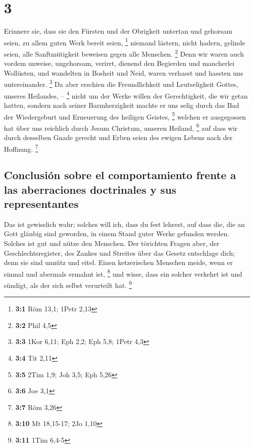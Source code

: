 \hypertarget{section-2}{%
\section{3}\label{section-2}}

 Erinnere sie, dass sie den Fürsten und der Obrigkeit
untertan und gehorsam seien, zu allem guten Werk bereit seien,
\footnote{\textbf{3:1} Röm 13,1; 1Petr 2,13}  niemand
lästern, nicht hadern, gelinde seien, alle Sanftmütigkeit beweisen gegen
alle Menschen. \footnote{\textbf{3:2} Phil 4,5}  Denn wir
waren auch vordem unweise, ungehorsam, verirrt, dienend den Begierden
und mancherlei Wollüsten, und wandelten in Bosheit und Neid, waren
verhasst und hassten uns untereinander. \footnote{\textbf{3:3} 1Kor
  6,11; Eph 2,2; Eph 5,8; 1Petr 4,3}  Da aber erschien die
Freundlichkeit und Leutseligkeit Gottes, unseres Heilandes, --
\footnote{\textbf{3:4} Tit 2,11}  nicht um der Werke
willen der Gerechtigkeit, die wir getan hatten, sondern nach seiner
Barmherzigkeit machte er uns selig durch das Bad der Wiedergeburt und
Erneuerung des heiligen Geistes, \footnote{\textbf{3:5} 2Tim 1,9; Joh
  3,5; Eph 5,26}  welchen er ausgegossen hat über uns
reichlich durch Jesum Christum, unseren Heiland, \footnote{\textbf{3:6}
  Joe 3,1}  auf dass wir durch desselben Gnade gerecht und
Erben seien des ewigen Lebens nach der Hoffnung. \footnote{\textbf{3:7}
  Röm 3,26}

\hypertarget{conclusiuxf3n-sobre-el-comportamiento-frente-a-las-aberraciones-doctrinales-y-sus-representantes}{%
\subsection{Conclusión sobre el comportamiento frente a las aberraciones
doctrinales y sus
representantes}\label{conclusiuxf3n-sobre-el-comportamiento-frente-a-las-aberraciones-doctrinales-y-sus-representantes}}

 Das ist gewisslich wahr; solches will ich, dass du fest
lehrest, auf dass die, die an Gott gläubig sind geworden, in einem Stand
guter Werke gefunden werden. Solches ist gut und nütze den Menschen.
 Der törichten Fragen aber, der Geschlechtsregister, des
Zankes und Streites über das Gesetz entschlage dich; denn sie sind
unnütz und eitel.  Einen ketzerischen Menschen meide,
wenn er einmal und abermals ermahnt ist, \footnote{\textbf{3:10} Mt
  18,15-17; 2Jo 1,10}  und wisse, dass ein solcher
verkehrt ist und sündigt, als der sich selbst verurteilt hat.
\footnote{\textbf{3:11} 1Tim 6,4-5}

